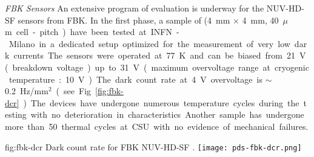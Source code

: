 


\textit{FBK Sensors} 
An extensive program of evaluation is underway for the NUV-HD-SF sensors from FBK. In the first phase, a sample of (\SI{4}{mm} $\times$ \SI{4}{mm}, \SI{40}{$\mu$m} cell-pitch) have been tested at INFN-Milano in a dedicated setup optimized for the measurement of very low dark currents. The sensors were operated at \SI{77}{K} and can be biased from \SI{21}{V} (breakdown voltage) up to \SI{31}{V} (maximum overvoltage range at cryogenic temperature: \SI{+10}{V}). The dark count rate at \SI{+4}{V} overvoltage is $\sim$\SI{0.2}{Hz/mm$^2$} (see Fig.~\ref{fig:fbk-dcr}). 

The devices have undergone numerous temperature cycles during the testing with no deterioration in characteristics. Another sample has undergone more than 50 thermal cycles at CSU with no evidence of mechanical failures.  %

\begin{dunefigure}
 {fig:fbk-dcr}
 {Dark count rate for FBK NUV-HD-SF .}
\texttt{[image: pds-fbk-dcr.png]}
\end{dunefigure}



